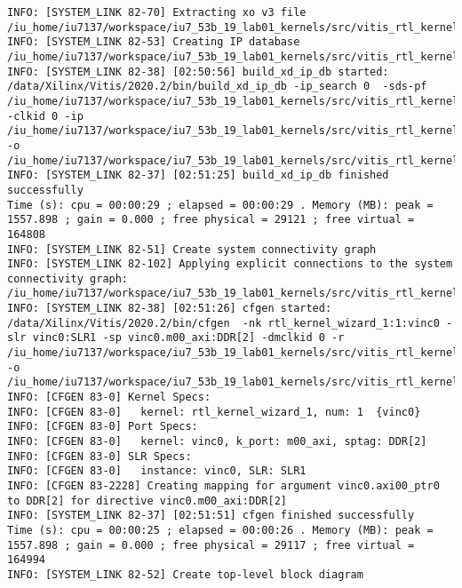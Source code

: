 \begin{center}
\begin{lstlisting}[label=lst:vlog,caption=Файл v++\_vinc.log]
INFO: [SYSTEM_LINK 82-70] Extracting xo v3 file /iu_home/iu7137/workspace/iu7_53b_19_lab01_kernels/src/vitis_rtl_kernel/rtl_kernel_wizard_1/rtl_kernel_wizard_1.xo
INFO: [SYSTEM_LINK 82-53] Creating IP database /iu_home/iu7137/workspace/iu7_53b_19_lab01_kernels/src/vitis_rtl_kernel/rtl_kernel_wizard_1/_x/link/sys_link/_sysl/.cdb/xd_ip_db.xml
INFO: [SYSTEM_LINK 82-38] [02:50:56] build_xd_ip_db started: /data/Xilinx/Vitis/2020.2/bin/build_xd_ip_db -ip_search 0  -sds-pf /iu_home/iu7137/workspace/iu7_53b_19_lab01_kernels/src/vitis_rtl_kernel/rtl_kernel_wizard_1/_x/link/sys_link/xilinx_u200_xdma_201830_2.hpfm -clkid 0 -ip /iu_home/iu7137/workspace/iu7_53b_19_lab01_kernels/src/vitis_rtl_kernel/rtl_kernel_wizard_1/_x/link/sys_link/iprepo/mycompany_com_kernel_rtl_kernel_wizard_1_1_0,rtl_kernel_wizard_1 -o /iu_home/iu7137/workspace/iu7_53b_19_lab01_kernels/src/vitis_rtl_kernel/rtl_kernel_wizard_1/_x/link/sys_link/_sysl/.cdb/xd_ip_db.xml
INFO: [SYSTEM_LINK 82-37] [02:51:25] build_xd_ip_db finished successfully
Time (s): cpu = 00:00:29 ; elapsed = 00:00:29 . Memory (MB): peak = 1557.898 ; gain = 0.000 ; free physical = 29121 ; free virtual = 164808
INFO: [SYSTEM_LINK 82-51] Create system connectivity graph
INFO: [SYSTEM_LINK 82-102] Applying explicit connections to the system connectivity graph: /iu_home/iu7137/workspace/iu7_53b_19_lab01_kernels/src/vitis_rtl_kernel/rtl_kernel_wizard_1/_x/link/sys_link/cfgraph/cfgen_cfgraph.xml
INFO: [SYSTEM_LINK 82-38] [02:51:26] cfgen started: /data/Xilinx/Vitis/2020.2/bin/cfgen  -nk rtl_kernel_wizard_1:1:vinc0 -slr vinc0:SLR1 -sp vinc0.m00_axi:DDR[2] -dmclkid 0 -r /iu_home/iu7137/workspace/iu7_53b_19_lab01_kernels/src/vitis_rtl_kernel/rtl_kernel_wizard_1/_x/link/sys_link/_sysl/.cdb/xd_ip_db.xml -o /iu_home/iu7137/workspace/iu7_53b_19_lab01_kernels/src/vitis_rtl_kernel/rtl_kernel_wizard_1/_x/link/sys_link/cfgraph/cfgen_cfgraph.xml
INFO: [CFGEN 83-0] Kernel Specs: 
INFO: [CFGEN 83-0]   kernel: rtl_kernel_wizard_1, num: 1  {vinc0}
INFO: [CFGEN 83-0] Port Specs: 
INFO: [CFGEN 83-0]   kernel: vinc0, k_port: m00_axi, sptag: DDR[2]
INFO: [CFGEN 83-0] SLR Specs: 
INFO: [CFGEN 83-0]   instance: vinc0, SLR: SLR1
INFO: [CFGEN 83-2228] Creating mapping for argument vinc0.axi00_ptr0 to DDR[2] for directive vinc0.m00_axi:DDR[2]
INFO: [SYSTEM_LINK 82-37] [02:51:51] cfgen finished successfully
Time (s): cpu = 00:00:25 ; elapsed = 00:00:26 . Memory (MB): peak = 1557.898 ; gain = 0.000 ; free physical = 29117 ; free virtual = 164994
INFO: [SYSTEM_LINK 82-52] Create top-level block diagram

\end{lstlisting}
\end{center}
